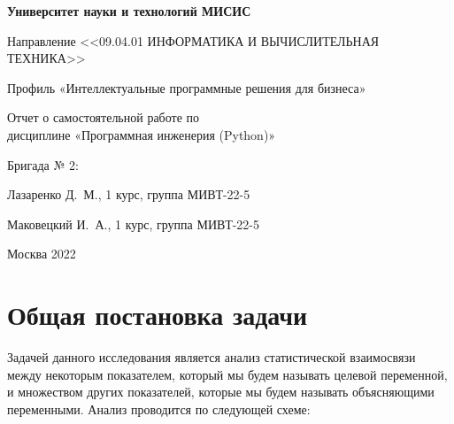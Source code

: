 \documentclass[12pt]{article}
\begin{document}
\pagestyle{empty}
\begin{center} \textbf{Университет науки и технологий МИСИС}

  Направление <<09.04.01 ИНФОРМАТИКА И ВЫЧИСЛИТЕЛЬНАЯ ТЕХНИКА>>

  Профиль «Интеллектуальные программные решения для бизнеса»

  \vspace{1.0cm}
  Отчет о самостоятельной работе по \\ дисциплине «Программная инженерия (Python)»

\end{center}

\vspace{10.0cm}
\begin{flushright}
{Бригада № 2}:

Лазаренко Д.~М., 1 курс, группа МИВТ-22-5

Маковецкий И.~А., 1 курс, группа МИВТ-22-5

\end{flushright}

\vspace*{\fill}

\begin{center}
Москва 2022
\end{center}

\newpage
\pagestyle{plain}
\renewcommand{\contentsname}{Оглавление}
\tableofcontents
\newpage

\section{Общая постановка задачи}
Задачей данного исследования является анализ статистической взаимосвязи между некоторым показателем, который мы будем называть целевой переменной, и множеством других показателей, которые мы будем называть объясняющими переменными. Анализ проводится по следующей схеме:
\end{document}
